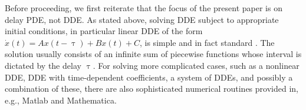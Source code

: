 \documentclass[final,1p,times]{elsarticle}
\begin{document}
Before proceeding, we first reiterate that the focus of the present paper is on delay PDE, not DDE. As stated above, solving DDE subject to appropriate initial conditions, in particular linear DDE of the form
$\dot{x}(t) = A x(t-\uptau) + B x(t) + C$,
is simple and in fact standard \cite{DDEbook}. 
The solution usually consists of an infinite sum of piecewise functions whose interval is dictated by the delay $\uptau$. For solving more complicated cases, such as a nonlinear DDE, DDE with time-dependent coefficients, a system of DDEs, and possibly a combination of these, there are also sophisticated numerical routines provided in, e.g., Matlab and Mathematica.
\end{document}
